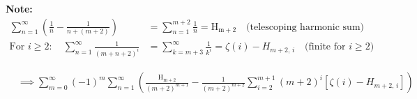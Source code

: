 \documentclass[12pt, a4paper]{article}
\begin{document}
\textbf{Note: }
\begin{align*}
    \sum_{n=1}^{\infty}\left(\frac{1}{n} - \frac{1}{n + (m+2)}\right)
    &= \sum_{n=1}^{m+2} \frac{1}{n} = \mathrm{H_{m+2}}
    \quad \text{(telescoping harmonic sum)} \\
    \text{For } i \geq 2: \quad \sum_{n=1}^{\infty} \frac{1}{(m+n+2)^i}
    &= \sum_{k=m+3}^{\infty} \frac{1}{k^i}
    = \zeta(i) - H_{m+2,\,i}
    \quad \text{(finite for } i \geq 2 \text{)}
\end{align*}

\begin{align*}
    & \implies \sum_{m=0}^{\infty} (-1)^m \sum_{n=1}^{\infty} \left( \frac{\mathrm{H_{m+2}}}{(m+2)^{m+1}} - \frac{1}{(m+2)^{m+2}} \sum_{i = 2}^{m+1} (m+2)^i \left[\zeta(i) - H_{m+2,\,i} \right] \right)
\end{align*}


\begin{center}
\end{center}
\end{document}
